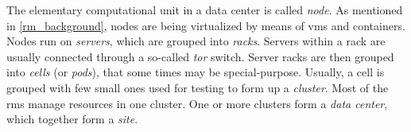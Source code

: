 
The elementary computational unit in a data center is called \textit{node}.
As mentioned in \autoref{rm_background}, nodes are being virtualized by means of \glspl{vm} and containers.
Nodes run on \textit{servers}, which are grouped into \textit{racks}.
Servers within a rack are usually connected through a so-called \textit{\gls{tor}} switch.
Server racks are then grouped into \textit{cells} (or \textit{pods}), that some times may be special-purpose.
Usually, a cell is grouped with few small ones used for testing to form up a \textit{cluster}.
Most of the \glspl{rm} manage resources in one cluster.
One or more clusters form a \textit{data center}, which together form a \textit{site}.